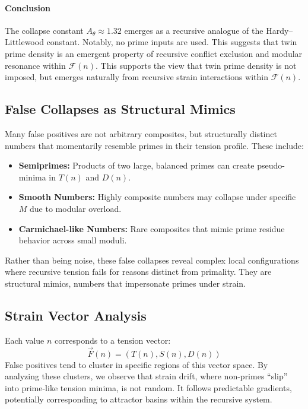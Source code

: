 \documentclass[11pt]{article}
\begin{document}
\paragraph{Conclusion}

The collapse constant \( A_\theta \approx 1.32 \) emerges as a recursive analogue of the Hardy–Littlewood constant. Notably, no prime inputs are used. This suggests that twin prime density is an emergent property of recursive conflict exclusion and modular resonance within \(\mathcal{F}(n)\). This supports the view that twin prime density is not imposed, but emerges naturally from recursive strain interactions within $\mathcal{F}(n)$.



\subsection{False Collapses as Structural Mimics}

Many false positives are not arbitrary composites, but structurally distinct numbers that momentarily resemble primes in their tension profile. These include:

\begin{itemize}
  \item \textbf{Semiprimes:} Products of two large, balanced primes can create pseudo-minima in $T(n)$ and $D(n)$.
  \item \textbf{Smooth Numbers:} Highly composite numbers may collapse under specific $M$ due to modular overload.
  \item \textbf{Carmichael-like Numbers:} Rare composites that mimic prime residue behavior across small moduli.
\end{itemize}

Rather than being noise, these false collapses reveal complex local configurations where recursive tension fails for reasons distinct from primality. They are structural mimics, numbers that impersonate primes under strain.


\subsection{Strain Vector Analysis}

Each value \(n\) corresponds to a tension vector:
\[
\vec{F}(n) = \left( T(n), S(n), D(n) \right)
\]
False positives tend to cluster in specific regions of this vector space. By analyzing these clusters, we observe that strain drift, where non-primes “slip” into prime-like tension minima, is not random. It follows predictable gradients, potentially corresponding to attractor basins within the recursive system.
\end{document}
